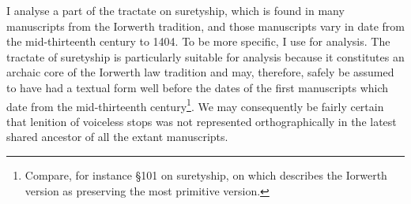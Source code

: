 

I analyse a part of the tractate on suretyship, which is found in many manuscripts from the Iorwerth tradition, and those manuscripts vary in date from the mid-thirteenth century to 1404.
To be more specific, I use \textcite[\S\S58--65]{wiliam_llyfr_1960} for analysis. The tractate of suretyship is particularly suitable for analysis because it constitutes an archaic core of the Iorwerth law tradition and may, therefore, safely be assumed to have had a textual form well before the dates of the first manuscripts which date from the mid-thirteenth century\footnote{Compare, for instance \S101 on suretyship, on which \textcite[20]{stacey_archaic_1986} describes the Iorwerth version as preserving the most primitive version.}. We may consequently be fairly certain that lenition of voiceless stops was not represented orthographically in the latest shared ancestor of all the extant manuscripts.

